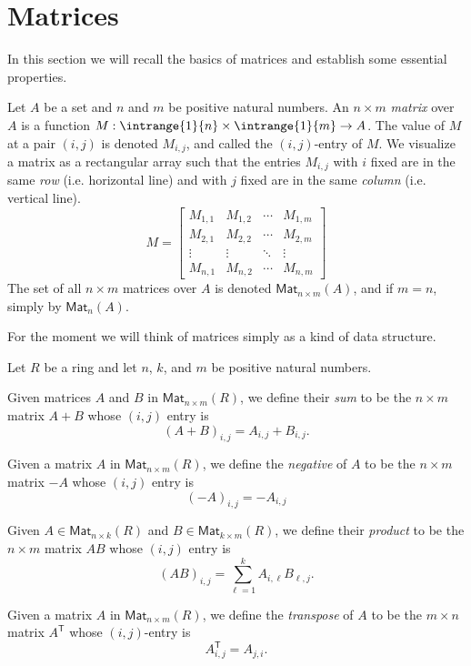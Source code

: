 \section{Matrices}

In this section we will recall the basics of matrices and establish some essential properties.

\begin{dfn}
Let $A$ be a set and $n$ and $m$ be positive natural numbers. An $n \times m$ \emph{matrix} over $A$ is a function $M : \intrange{1}{n} \times \intrange{1}{m} \rightarrow A$. The value of $M$ at a pair $(i,j)$ is denoted $M_{i,j}$, and called the $(i,j)$-entry of $M$. We visualize a matrix as a rectangular array such that the entries $M_{i,j}$ with $i$ fixed are in the same \emph{row} (i.e. horizontal line) and with $j$ fixed are in the same \emph{column} (i.e. vertical line). \[M = \left[\begin{array}{cccc} M_{1,1} & M_{1,2} & \cdots & M_{1,m} \\ M_{2,1} & M_{2,2} & \cdots & M_{2,m} \\ \vdots & \vdots & \ddots & \vdots \\ M_{n,1} & M_{n,2} & \cdots & M_{n,m} \end{array}\right]\] The set of all $n \times m$ matrices over $A$ is denoted $\mathsf{Mat}_{n \times m}(A)$, and if $m = n$, simply by $\mathsf{Mat}_n(A)$.
\end{dfn}

For the moment we will think of matrices simply as a kind of data structure.

\begin{dfn} 
\label{dfn:matrix-ops}
Let $R$ be a ring and let $n$, $k$, and $m$ be positive natural numbers.
\begin{enumerate*}
\item Given matrices $A$ and $B$ in $\mathsf{Mat}_{n \times m}(R)$, we define their \emph{sum} to be the $n \times m$ matrix $A+B$ whose $(i,j)$ entry is $$(A+B)_{i,j} = A_{i,j} + B_{i,j}.$$

\item Given a matrix $A$ in $\mathsf{Mat}_{n \times m}(R)$, we define the \emph{negative} of $A$ to be the $n \times m$ matrix $-A$ whose $(i,j)$ entry is $$(-A)_{i,j} = -A_{i,j}$$

\item Given $A \in \mathsf{Mat}_{n \times k}(R)$ and $B \in \mathsf{Mat}_{k \times m}(R)$, we define their \emph{product} to be the $n \times m$ matrix $AB$ whose $(i,j)$ entry is $$(AB)_{i,j} = \sum_{\ell=1}^k A_{i,\ell}B_{\ell,j}.$$

\item Given a matrix $A$ in $\mathsf{Mat}_{n \times m}(R)$, we define the \emph{transpose} of $A$ to be the $m \times n$ matrix $A^\mathsf{T}$ whose $(i,j)$-entry is $$A^\mathsf{T}_{i,j} = A_{j,i}.$$
\end{enumerate*}
\end{dfn}


